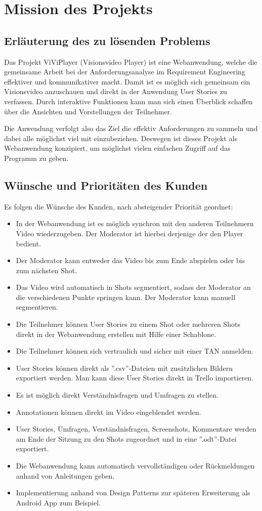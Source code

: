 \section{Mission des Projekts}

\subsection{Erläuterung des zu lösenden Problems}
Das Projekt ViViPlayer (Visionsvideo Player) ist eine Webanwendung, welche die gemeinsame Arbeit 
bei der Anforderungsanalyse im Requirement Engineering effektiver und kommunikativer macht.
Damit ist es möglich sich gemeinsam ein Visionsvideo anzuschauen und direkt in der Anwendung User Stories
zu verfassen. Durch interaktive Funktionen kann man sich einen Überblick schaffen über die Ansichten und Vorstellungen der Teilnehmer.

Die Anwendung verfolgt also das Ziel die effektiv Anforderungen zu sammeln und dabei alle möglichst viel mit einzubeziehen.
Deswegen ist dieses Projekt als Webanwendung konzipiert, um möglichst vielen einfachen Zugriff auf das Programm zu geben.

\subsection{Wünsche und Prioritäten des Kunden}
	Es folgen die Wünsche des Kunden, nach absteigender Priorität geordnet:
	\begin{itemize}
		\item In der Webanwendung ist es möglich synchron mit den anderen Teilnehmern Video wiederzugeben. Der Moderator ist hierbei derjenige der den Player bedient.
		\item Der Moderator kann entweder das Video bis zum Ende abspielen oder bis zum nächsten Shot.
		\item Das Video wird automatisch in Shots segmentiert, sodass der Moderator an die verschiedenen Punkte springen kann. Der Moderator kann manuell segmentieren.
		\item Die Teilnehmer können User Stories zu einem Shot oder mehreren Shots direkt in der Webanwendung erstellen mit Hilfe einer Schablone.
		\item Die Teilnehmer können sich vertraulich und sicher mit einer TAN anmelden.
		\item User Stories können direkt als ''.csv''-Dateien mit zusätzlichen Bildern exportiert werden. Man kann diese User Stories direkt in Trello importieren.
		\item Es ist möglich direkt Verständnisfragen und Umfragen zu stellen.
		\item Annotationen können direkt im Video eingeblendet werden.
		\item User Stories, Umfragen, Verständnisfragen, Screenshots, Kommentare werden am Ende der Sitzung zu den Shots zugeordnet und in eine ''.odt''-Datei exportiert.
		\item Die Webanwendung kann automatisch vervollständigen oder Rückmeldungen anhand von Anleitungen geben.
		\item Implementierung anhand von Design Patterns zur späteren Erweiterung als Android App zum Beispiel.
	\end{itemize}


